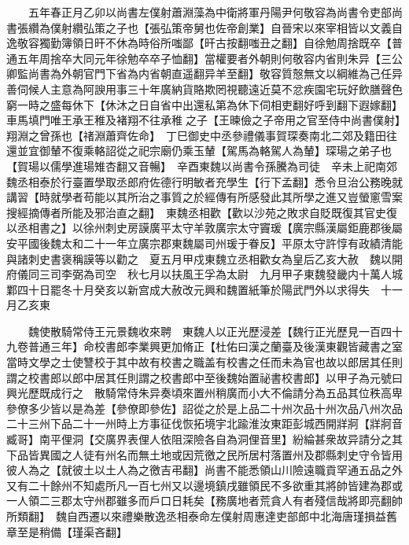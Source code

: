 　　五年春正月乙卯以尚書左僕射蕭淵藻為中衛將軍丹陽尹何敬容為尚書令吏部尚書張纘為僕射纘弘策之子也【張弘策帝舅也佐帝創業】自晉宋以來宰相皆以文義自逸敬容獨勤簿領日旰不休為時俗所嗤鄙【旰古按翻嗤丑之翻】自徐勉周捨既卒【普通五年周捨卒大同元年徐勉卒卒子恤翻】當權要者外朝則何敬容内省則朱异【三公卿監尚書為外朝官門下省為内省朝直遥翻异羊至翻】敬容質慤無文以綱維為己任异善伺候人主意為阿諛用事三十年廣納貨賂欺罔視聽遠近莫不忿疾園宅玩好飲膳聲色窮一時之盛每休下【休沐之日自省中出還私第為休下伺相吏翻好呼到翻下遐嫁翻】車馬填門唯王承王稚及褚翔不往承稚之子【王暕儉之子帝用之官至侍中尚書僕射】翔淵之曾孫也【禇淵蕭齊佐命】　丁巳御史中丞參禮儀事賀琛奏南北二郊及籍田往還並宜御輦不復乘輅詔從之祀宗廟仍乘玉輦【駕馬為輅駕人為輦】琛瑒之弟子也【賀瑒以儒學進瑒雉杏翻又音暢】　辛酉東魏以尚書令孫騰為司徒　辛未上祀南郊　魏丞相泰於行臺置學取丞郎府佐德行明敏者充學生【行下孟翻】悉令旦治公務晚就講習【時就學者苟能以其所治之事質之於經傳有所感發此其所學之進又豈螢窻雪案搜經摘傳者所能及邪治直之翻】　東魏丞相歡【歡以沙苑之敗求自貶既復其官史復以丞相書之】以徐州刺史房謨廣平太守羊敦廣宗太守竇瑗【廣宗縣漢屬鉅鹿郡後屬安平國後魏太和二十一年立廣宗郡東魏屬司州瑗于眷反】平原太守許惇有政績清能與諸刺史書褒稱謨等以勸之　夏五月甲戍東魏立丞相歡女為皇后乙亥大赦　魏以開府儀同三司李弼為司空　秋七月以扶風王孚為太尉　九月甲子東魏發畿内十萬人城鄴四十日罷冬十月癸亥以新宫成大赦改元興和魏置紙筆於陽武門外以求得失　十一月乙亥東

　　魏使散騎常侍王元景魏收來聘　東魏人以正光歷浸差【魏行正光歷見一百四十九卷普通三年】命校書郎李業興更加脩正【杜佑曰漢之蘭臺及後漢東觀皆藏書之室當時文學之士使讐校于其中故有校書之職盖有校書之任而未為官也故以郎居其任則謂之校書郎以郎中居其任則謂之校書郎中至後魏始置祕書校書郎】以甲子為元號曰興光歷既成行之　散騎常侍朱异奏頃來置州稍廣而小大不倫請分為五品其位秩高卑參僚多少皆以是為差【參僚即參佐】詔從之於是上品二十州次品十州次品八州次品二十三州下品二十一州時上方事征伐恢拓境宇北踰淮汝東距彭城西開牂牁【牂牁音臧哥】南平俚洞【交廣界表俚人依阻深險各自為洞俚音里】紛綸甚衆故异請分之其下品皆異國之人徒有州名而無土地或因荒徼之民所居村落置州及郡縣刺史守令皆用彼人為之【就彼土以土人為之徼吉弔翻】尚書不能悉領山川險遠職貢罕通五品之外又有二十餘州不知處所凡一百七州又以邊境鎮戌雖領民不多欲重其將帥皆建為郡或一人領二三郡太守州郡雖多而戶口日耗矣【務廣地者荒貪人有者殘信哉將即亮翻帥所類翻】　魏自西遷以來禮樂散逸丞相泰命左僕射周惠達吏部郎中北海唐瑾損益舊章至是稍備【瑾渠吝翻】

